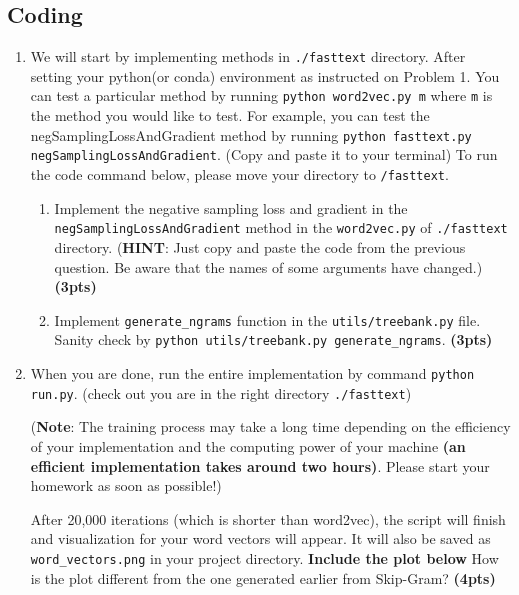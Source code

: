 \documentclass{assignment format}
\begin{document}
\subsection{Coding}

\begin{enumerate}[label=(\alph*)]
    \item We will start by implementing methods in \texttt{./fasttext} directory. After setting your python(or conda) environment as instructed on Problem 1. You can test a particular method by running \texttt{python word2vec.py m} where \texttt{m} is the method you would like to test. For example, you can test the negSamplingLossAndGradient method by running \texttt{python fasttext.py negSamplingLossAndGradient}. (Copy and paste it to your terminal)
    \newline
    To run the code command below, please move your directory to \texttt{/fasttext}.
        \begin{enumerate}[label=(\roman*)]
        \item Implement the negative sampling loss and gradient in the \texttt{negSamplingLossAndGradient} method in the \texttt{word2vec.py} of \texttt{./fasttext} directory. (\textbf{HINT}: Just copy and paste the code from the previous question. Be aware that the names of some arguments have changed.) \textbf{(3pts)}
        \item Implement \texttt{generate\_ngrams} function in the \texttt{utils/treebank.py} file. Sanity check by \texttt{python utils/treebank.py generate\_ngrams}. \textbf{(3pts)}
    \end{enumerate}
    \item When you are done, run the entire implementation by command \texttt{python run.py}. (check out you are in the right directory \texttt{./fasttext})

    (\textbf{Note}: The training process may take a long time depending on the efficiency of your implementation and the computing power of your machine \textbf{(an efficient implementation takes around two hours)}. Please start your homework as soon as possible!)

    After 20,000 iterations (which is shorter than word2vec), the script will finish and visualization for your word vectors will appear. It will also be saved as \texttt{word\_vectors.png} in your project directory. \textbf{Include the plot below} How is the plot different from the one generated earlier from Skip-Gram? \textbf{(4pts)}
    

\end{enumerate}
\end{document}
